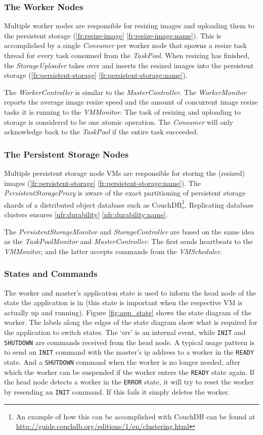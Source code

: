 \documentclass[10pt,journal,compsoc]{IEEEtran}
\def\namedref#1{\ref{#1} \ref{#1:name}}
\begin{document}
\subsubsection{The Worker Nodes}
Multiple worker nodes are responsible for resizing images
and uploading them to the persistent storage (\namedref{fr:resize-image}). This is accomplished by a
single \emph{Consumer} per worker node that spawns a resize task thread for
every task consumed from the \emph{TaskPool}. When resizing has finished,
the \emph{StorageUploader} takes over and inserts the resized images into the
persistent storage (\namedref{fr:persistent-storage}). 

The \emph{WorkerController} is similar to the \emph{MasterController}. The
\emph{WorkerMonitor} reports the average image resize speed and the amount of
concurrent image resize tasks it is running to the \emph{VMMonitor}. 
The task of resizing and uploading to storage is considered
to be one atomic operation. The \emph{Consumer} will only acknowledge back to
the \emph{TaskPool} if the entire task succeeded.



\subsubsection{The Persistent Storage Nodes}
Multiple persistent storage node VMs are responsible for storing the (resized)
images (\namedref{fr:persistent-storage}). The \emph{PersistentStorageProxy} is aware of the exact partitioning of
persistent storage shards of a distributed object database such as
CouchDB\footnote{An example of how this can be accomplished with CouchDB can be
found at \url{http://guide.couchdb.org/editions/1/en/clustering.html}}. Replicating
database clusters ensures \namedref{nfr:durability}.


The
\emph{PersistentStorageMonitor} and \emph{StorageController} are based on the
same idea as the \emph{TaskPoolMonitor} and \emph{MasterController}. The first
sends heartbeats to the \emph{VMMonitor}, and the latter accepts commands from
the \emph{VMScheduler}.


\subsubsection{States and Commands}
The worker and master's application state is used to inform the head node of 
the state the application is in (this state is important when the respective VM
is actually up and running). Figure \ref{fig:app_state} shows the state diagram of
the worker. The labels along the edges of the state diagram show what is
required for the application to switch states. The `err' is an 
internal event, while \texttt{INIT} and \texttt{SHUTDOWN} are commands received from the head
node. A typical usage pattern is to send an \texttt{INIT} command with the
master's ip address to a worker in the \texttt{READY} state. And a
\texttt{SHUTDOWN} command when the worker is no longer needed, after which the
worker can be suspended if the worker enters the \texttt{READY} state again. If
the head node detects a worker in the \texttt{ERROR} state, it will try to
reset the worker by resending an \texttt{INIT} command. If this fails it simply
deletes the worker.
\end{document}
